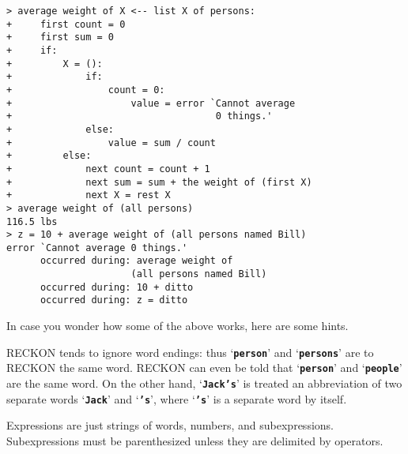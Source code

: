 \documentclass[12pt]{article}
\newcommand{\TT}[1]{{\tt \bfseries #1}}
\newenvironment{indpar}[1][0.3in]%
	{\begin{list}{}%
		     {\setlength{\itemsep}{0in}%
		      \setlength{\topsep}{0in}%
		      \setlength{\parsep}{1ex}%
		      \setlength{\labelwidth}{#1}%
		      \setlength{\leftmargin}{#1}%
		      \addtolength{\leftmargin}{\labelsep}}%
	 \item}%
	{\end{list}}
\begin{document}
\begin{indpar}
\verb|> average weight of X <-- list X of persons:| \\
\verb|+     first count = 0| \\
\verb|+     first sum = 0| \\
\verb|+     if:| \\
\verb|+         X = ():| \\
\verb|+             if:| \\
\verb|+                 count = 0:| \\
\verb|+                     value = error `Cannot average| \\
\verb|+                                    0 things.'| \\
\verb|+             else:| \\
\verb|+                 value = sum / count| \\
\verb|+         else:| \\
\verb|+             next count = count + 1| \\
\verb|+             next sum = sum + the weight of (first X)| \\
\verb|+             next X = rest X| \\
\verb|> average weight of (all persons)| \\
\verb|116.5 lbs| \\
\verb|> z = 10 + average weight of (all persons named Bill)| \\
\verb|error `Cannot average 0 things.'| \\
\verb|      occurred during: average weight of| \\
\verb|                      (all persons named Bill)| \\
\verb|      occurred during: 10 + ditto| \\
\verb|      occurred during: z = ditto|
\end{indpar}

In case you wonder how some of the above works, here are some hints.

RECKON tends to ignore word endings: thus `\TT{person}' and
`\TT{persons}' are to RECKON the same word.
RECKON can even be told that `\TT{person}'
and `\TT{people}' are the same word.
On the other hand, `\TT{Jack's}' is treated an abbreviation
of two separate words `\TT{Jack}' and `\TT{'s}', where `\TT{'s}' is
a separate word by itself.

Expressions are just strings of words, numbers, and subexpressions.
Subexpressions must be parenthesized unless they
are delimited by operators.
\end{document}
